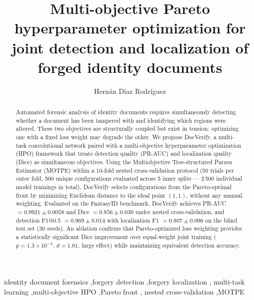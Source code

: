 \documentclass[final,5p,times,twocolumn,authoryear]{elsarticle}
\begin{document}
\begin{frontmatter}

\title{Multi-objective Pareto hyperparameter optimization for joint detection and
       localization of forged identity documents}

\author[1]{Hern\'{a}n D\'{i}az Rodr\'{i}guez}

\address[1]{Department of Computer Science, University of Oviedo, Asturias, Spain}

\begin{abstract}
Automated forensic analysis of identity documents requires simultaneously
detecting whether a document has been tampered with and identifying which
regions were altered. These two objectives are structurally coupled but exist
in tension: optimizing one with a fixed loss weight may degrade the other.
We propose DocVerify, a multi-task convolutional network paired with a
multi-objective hyperparameter optimization (HPO) framework that treats
detection quality (PR-AUC) and localization quality (Dice) as simultaneous
objectives. Using the Multiobjective Tree-structured Parzen Estimator (MOTPE)
within a 10-fold nested cross-validation protocol (50 trials per outer fold,
500 unique configurations evaluated across 5 inner splits — 2\,500 individual
model trainings in total), DocVerify selects configurations from the
Pareto-optimal front by minimizing Euclidean distance to the ideal point
$(1,1)$, without any manual weighting. Evaluated on the FantasyID benchmark,
DocVerify achieves PR-AUC $= 0.9921 \pm 0.0058$ and
Dice $= 0.856 \pm 0.030$ under nested cross-validation, and detection
F1@0.5 $= 0.969 \pm 0.014$ with localization F1 $= 0.807 \pm 0.096$ on the
blind test set (30 seeds). An ablation confirms that Pareto-optimized loss
weighting provides a statistically significant Dice improvement over
equal-weight joint training ($p = 1.3 \times 10^{-4}$, $d = 1.01$, large
effect) while maintaining equivalent detection accuracy.
\end{abstract}

\begin{keyword}
identity document forensics \sep forgery detection \sep forgery localization \sep
multi-task learning \sep multi-objective HPO \sep Pareto front \sep
nested cross-validation \sep MOTPE
\end{keyword}

\end{frontmatter}

\end{document}
